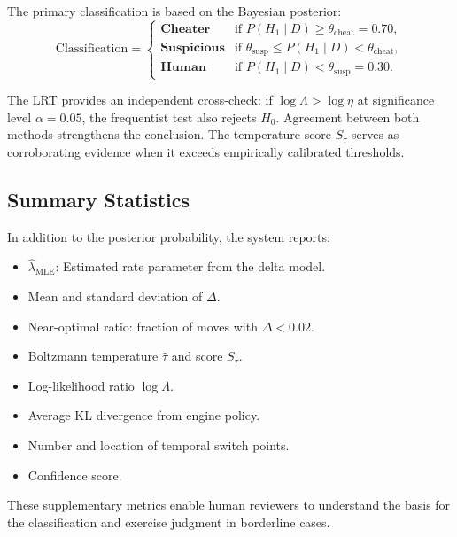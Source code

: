 \documentclass[11pt,a4paper]{article}
\begin{document}
The primary classification is based on the Bayesian posterior:
\begin{equation}
    \text{Classification} = \begin{cases}
        \textbf{Cheater} & \text{if } P(H_1 \mid D) \geq \theta_{\text{cheat}}
            = 0.70, \\
        \textbf{Suspicious} & \text{if } \theta_{\text{susp}} \leq
            P(H_1 \mid D) < \theta_{\text{cheat}}, \\
        \textbf{Human} & \text{if } P(H_1 \mid D) < \theta_{\text{susp}}
            = 0.30.
    \end{cases}
    \label{eq:classification}
\end{equation}

The LRT provides an independent cross-check: if $\log \Lambda > \log \eta$
at significance level $\alpha = 0.05$, the frequentist test also rejects
$H_0$. Agreement between both methods strengthens the conclusion.
The temperature score $S_{\tau}$ serves as corroborating evidence when it
exceeds empirically calibrated thresholds.

\subsection{Summary Statistics}

In addition to the posterior probability, the system reports:
\begin{itemize}
    \item $\hat{\lambda}_{\text{MLE}}$: Estimated rate parameter from the delta
          model.
    \item Mean and standard deviation of $\Delta$.
    \item Near-optimal ratio: fraction of moves with $\Delta < 0.02$.
    \item Boltzmann temperature $\hat{\tau}$ and score $S_{\tau}$.
    \item Log-likelihood ratio $\log \Lambda$.
    \item Average KL divergence from engine policy.
    \item Number and location of temporal switch points.
    \item Confidence score.
\end{itemize}

These supplementary metrics enable human reviewers to understand the basis for
the classification and exercise judgment in borderline cases.


\end{document}
